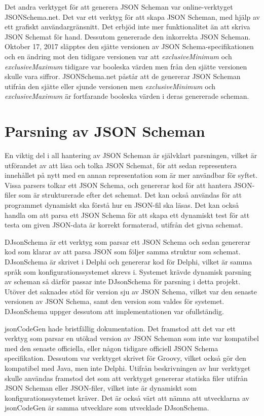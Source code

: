 Det andra verktyget för att generera JSON Scheman var online-verktyget JSONSchema.net. Det var ett verktyg för att skapa JSON Scheman, med hjälp av ett grafiskt användargränsnitt. Det erbjöd inte mer funktionalitet än att skriva JSON Schemat för hand. Dessutom genererade den inkorrekta JSON Scheman. Oktober 17, 2017 släpptes den sjätte versionen av JSON Schema-specifikationen och en ändring mot den tidigare versionen var att \textit{exclusiveMinimum} och \textit{exclusiveMaximum} tidigare var booleska värden men från den sjätte versionen skulle vara siffror. \cite{Andrews} JSONSchema.net påstår att de genererar JSON Scheman utifrån den sjätte eller sjunde versionen men \textit{exclusiveMinimum} och \textit{exclusiveMaximum} är fortfarande booleska värden i deras genererade scheman. \cite{Jackwootton}

\section{Parsning av JSON Scheman}

En viktig del i all hantering av JSON Scheman är självklart parsningen, vilket är utförandet av att läsa och tolka JSON Schemat, för att sedan representera innehållet på nytt med en annan representation som är mer användbar för syftet. Vissa parsers tolkar ett JSON Schema, och genererar kod för att hantera JSON-filer som är strukturerade efter det schemat. Det kan också användas för att programmet dynamiskt ska förstå hur en JSON-fil ska läsas. Det kan också handla om att parsa ett JSON Schema för att skapa ett dynamiskt test för att testa om given JSON-data är korrekt formaterad, utifrån det givna schemat.

DJsonSchema är ett verktyg som parsar ett JSON Schema och sedan genererar kod som klarar av att parsa JSON som följer samma struktur som schemat. DJsonSchema är skrivet i Delphi och genererar kod för Delphi, vilket är samma språk som konfigurationssystemet skrevs i. Systemet krävde dynamisk parsning av scheman så därför passar inte DJsonSchema för parsning i detta projekt. Utöver det saknades stöd för version sju av JSON Schema, vilket var den senaste versionen av JSON Schema, samt den version som valdes för systemet. DJsonSchema uppger dessutom att implementationen var ofullständig. \cite{Schlothauer&WauerGmbH}

jsonCodeGen hade bristfällig dokumentation. Det framstod att det var ett verktyg som parsar en utökad version av JSON Scheman som inte var kompatibel med den senaste officiella, eller någon tidigare officiell JSON Schema specifikation. Dessutom var verktyget skrivet för Groovy, vilket också gör den kompatibel med Java, men inte Delphi. Utifrån beskrivningen av hur verktyget skulle användas framstod det som att verktyget genererar statiska filer utifrån JSON Scheman eller JSON-filer, vilket inte är dynamiskt som konfigurationssystemet kräver. Det är också värt att nämna att utvecklarna av jsonCodeGen är samma utvecklare som utvecklade DJsonSchema. \cite{Schlothauer&WauerGmbHa} 

